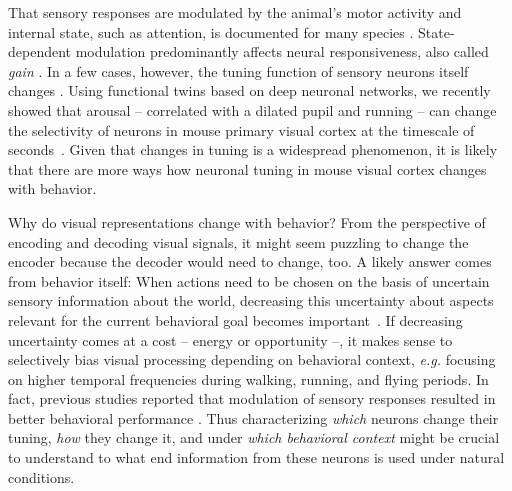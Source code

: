 \documentclass[COG,11pt]{ercgrant}
\begin{document}
That sensory responses are modulated by the animal's motor activity and internal state, such as attention, is documented for many species \parencite{Rowell1971-zj, Wiersma1968-xt, Maimon2010-sa, Niell2010-bs,Bezdudnaya2006-ge, Treue1996-lp, Musall2019-kd}.
State-dependent modulation predominantly affects neural responsiveness, also called \textit{gain} \parencite{Eggermann2014-xp, Niell2010-bs, McAdams1999-cs,Schroder2020-jl, Dadarlat2017-jw, Mineault2016-fk}. 
In a few cases, however, the tuning function of sensory neurons itself changes \parencite{Chiappe2010-bm, Bezdudnaya2006-ge, Andermann2011-vw, Treue1996-lp}. 
Using functional twins based on deep neuronal networks, we recently showed that arousal -- correlated with a dilated pupil and running -- can change the selectivity of neurons in mouse primary visual cortex at the timescale of seconds~\parencite{Franke2022-do}. 
Given that changes in tuning is a widespread phenomenon, it is likely that there are more ways how neuronal tuning in mouse visual cortex changes with behavior. 

Why do visual representations change with behavior? 
From the perspective of encoding and decoding visual signals, it might seem puzzling to change the encoder because the decoder would need to change, too. 
A likely answer comes from behavior itself:
When actions need to be chosen on the basis of uncertain sensory information about the world, decreasing this uncertainty about aspects relevant for the current behavioral goal becomes important~\parencite{Chebolu2022-tb}. 
If decreasing uncertainty comes at a cost -- energy or opportunity --, it makes sense to selectively bias visual processing depending on behavioral context, \textit{e.g.} focusing on  higher temporal frequencies during walking, running, and flying periods.
In fact, previous studies reported that modulation of sensory responses resulted in better behavioral performance \parencite{Spitzer1988-kq, Bennett2013-rk, Dadarlat2017-jw, De_Gee2022-ir}.
Thus characterizing \textit{which} neurons change their tuning, \textit{how} they change it, and under \textit{which behavioral context} might be crucial to understand to what end information from these neurons is used under natural conditions.
\end{document}
